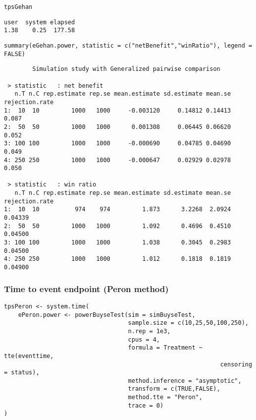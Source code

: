 \documentclass[12pt]{article}
\begin{document}
\lstset{language=r,label= ,caption= ,captionpos=b,numbers=none}
\begin{lstlisting}
tpsGehan
\end{lstlisting}

\begin{verbatim}
user  system elapsed 
1.38    0.25  177.58
\end{verbatim}

\lstset{language=r,label= ,caption= ,captionpos=b,numbers=none}
\begin{lstlisting}
summary(eGehan.power, statistic = c("netBenefit","winRatio"), legend = FALSE)
\end{lstlisting}

\begin{verbatim}
        Simulation study with Generalized pairwise comparison

 > statistic   : net benefit
   n.T n.C rep.estimate rep.se mean.estimate sd.estimate mean.se rejection.rate
1:  10  10         1000   1000     -0.003120     0.14812 0.14413          0.087
2:  50  50         1000   1000      0.001308     0.06445 0.06620          0.052
3: 100 100         1000   1000     -0.000690     0.04785 0.04690          0.049
4: 250 250         1000   1000     -0.000647     0.02929 0.02978          0.050

 > statistic   : win ratio
   n.T n.C rep.estimate rep.se mean.estimate sd.estimate mean.se rejection.rate
1:  10  10          974    974         1.873      3.2268  2.0924        0.04339
2:  50  50         1000   1000         1.092      0.4696  0.4510        0.04500
3: 100 100         1000   1000         1.038      0.3045  0.2983        0.04500
4: 250 250         1000   1000         1.012      0.1818  0.1819        0.04900
\end{verbatim}

\clearpage

\subsubsection{Time to event endpoint (Peron method)}
\label{sec:orga7c5d77}
\lstset{language=r,label= ,caption= ,captionpos=b,numbers=none}
\begin{lstlisting}
tpsPeron <- system.time(
	ePeron.power <- powerBuyseTest(sim = simBuyseTest, 
								   sample.size = c(10,25,50,100,250), 
								   n.rep = 1e3,
								   cpus = 4,
								   formula = Treatment ~ tte(eventtime, 
															 censoring = status), 
								   method.inference = "asymptotic",
								   transform = c(TRUE,FALSE),
								   method.tte = "Peron",
								   trace = 0)
)
\end{lstlisting}
\end{document}
